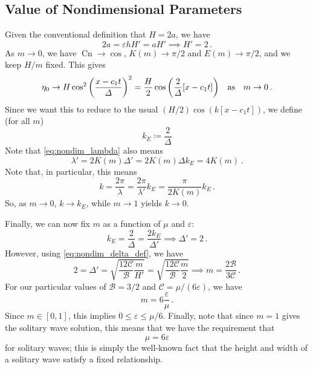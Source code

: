 \documentclass{jfm}
\let\Oldsubsection\subsection
\renewcommand{\subsection}{\FloatBarrier\Oldsubsection}
\DeclareMathOperator{\cn}{Cn}
\renewcommand*{\epsilon}{\varepsilon}
\begin{document}
\subsection{Value of Nondimensional Parameters}
Given the conventional definition that $H = 2 a$, we have
\begin{equation}
  2 a = \epsilon h H' = a H' \implies H' = 2 \,.
\end{equation}
As $m \to 0$, we have $\cn \to \cos$, $K(m) \to \pi/2$ and $E(m) \to
\pi/2$, and we keep $H/m$ fixed.
This gives
\begin{equation}
  \eta_0 \to H \cos^2 \pqty{\frac{x-c_1 t}{\Delta}}^2
  = \frac{H}{2} \cos \pqty{\frac{2}{\Delta} \bqty{x-c_1 t}}
  \qq{as} m \to 0 \,.
\end{equation}
Since we want this to reduce to the usual $(H/2) \cos(k[x-c_1 t])$, we
define (for all $m$)
\begin{equation}
  k_E \coloneqq \frac{2}{\Delta}
\end{equation}
Note that \cref{eq:nondim_lambda} also means
\begin{equation}
  \lambda' = 2 K(m) \Delta' = 2 K(m) \Delta k_E = 4 K(m) \,.
\end{equation}
Note that, in particular, this means
\begin{equation}
  k = \frac{2 \pi}{\lambda} = \frac{2 \pi}{\lambda'} k_E
  = \frac{\pi}{2 K(m)} k_E \,.
\end{equation}
So, as $m \to 0$, $k \to k_E$, while $m \to 1$ yields $k \to 0$.

Finally, we can now fix $m$ as a function of $\mu$ and $\epsilon$:
\begin{equation}
  k_E = \frac{2}{\Delta} = \frac{2 k_E}{\Delta'}
  \implies \Delta' = 2 \,.
\end{equation}
However, using \cref{eq:nondim_delta_def}, we have
\begin{equation}
  2 = \Delta ' = \sqrt{\frac{12 \mathcal{C}}{\mathcal{B}}
    \frac{m}{H'}}
  = \sqrt{\frac{12 \mathcal{C}}{\mathcal{B}} \frac{m}{2}}
  \implies m = \frac{2 \mathcal{B}}{3 \mathcal{C}} \,.
\end{equation}
For our particular values of $\mathcal{B} = 3/2$ and $\mathcal{C} =
\mu/(6 \epsilon)$, we have
\begin{equation}
  m = 6 \frac{\epsilon}{\mu} \,.
\end{equation}
Since $m \in [0,1]$, this implies $0 \le \epsilon \le \mu/6$.
Finally, note that since $m = 1$ gives the solitary wave solution, this
means that we have the requirement that
\begin{equation}
  \mu = 6 \epsilon
\end{equation}
for solitary waves; this is simply the well-known fact that the height
and width of a solitary wave satisfy a fixed relationship.
\end{document}
